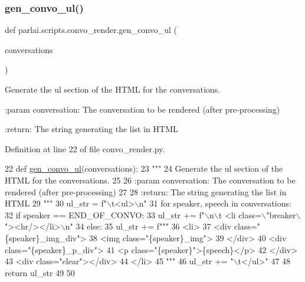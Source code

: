 \subsubsection{\texorpdfstring{gen\+\_\+convo\+\_\+ul()}{gen\_convo\_ul()}}
{\footnotesize\ttfamily def parlai.\+scripts.\+convo\+\_\+render.\+gen\+\_\+convo\+\_\+ul (\begin{DoxyParamCaption}\item[{}]{conversations }\end{DoxyParamCaption})}

\begin{DoxyVerb}Generate the ul section of the HTML for the conversations.

:param conversation: The conversation to be rendered (after pre-processing)

:return: The string generating the list in HTML
\end{DoxyVerb}
 

Definition at line 22 of file convo\+\_\+render.\+py.


\begin{DoxyCode}
22 \textcolor{keyword}{def }\hyperlink{namespaceparlai_1_1scripts_1_1convo__render_a8c393321c36d1cafceb86aa3f7431c4c}{gen\_convo\_ul}(conversations):
23     \textcolor{stringliteral}{"""}
24 \textcolor{stringliteral}{    Generate the ul section of the HTML for the conversations.}
25 \textcolor{stringliteral}{}
26 \textcolor{stringliteral}{    :param conversation: The conversation to be rendered (after pre-processing)}
27 \textcolor{stringliteral}{}
28 \textcolor{stringliteral}{    :return: The string generating the list in HTML}
29 \textcolor{stringliteral}{    """}
30     ul\_str = f\textcolor{stringliteral}{"\(\backslash\)t<ul>\(\backslash\)n"}
31     \textcolor{keywordflow}{for} speaker, speech \textcolor{keywordflow}{in} conversations:
32         \textcolor{keywordflow}{if} speaker == END\_OF\_CONVO:
33             ul\_str += f\textcolor{stringliteral}{"\(\backslash\)n\(\backslash\)t  <li class=\(\backslash\)"breaker\(\backslash\)"><hr/></li>\(\backslash\)n"}
34         \textcolor{keywordflow}{else}:
35             ul\_str += f\textcolor{stringliteral}{"""}
36 \textcolor{stringliteral}{    <li>}
37 \textcolor{stringliteral}{        <div class="\{speaker\}\_img\_div">}
38 \textcolor{stringliteral}{            <img class="\{speaker\}\_img">}
39 \textcolor{stringliteral}{        </div>}
40 \textcolor{stringliteral}{        <div class="\{speaker\}\_p\_div">}
41 \textcolor{stringliteral}{            <p class="\{speaker\}">\{speech\}</p>}
42 \textcolor{stringliteral}{        </div>}
43 \textcolor{stringliteral}{        <div class="clear"></div>}
44 \textcolor{stringliteral}{    </li>}
45 \textcolor{stringliteral}{    """}
46     ul\_str += \textcolor{stringliteral}{"\(\backslash\)t</ul>"}
47 
48     \textcolor{keywordflow}{return} ul\_str
49 
50 
\end{DoxyCode}
\mbox{\label{namespaceparlai_1_1scripts_1_1convo__render_ad23695f4d64e7dbd1fee801098d570b2}} 
